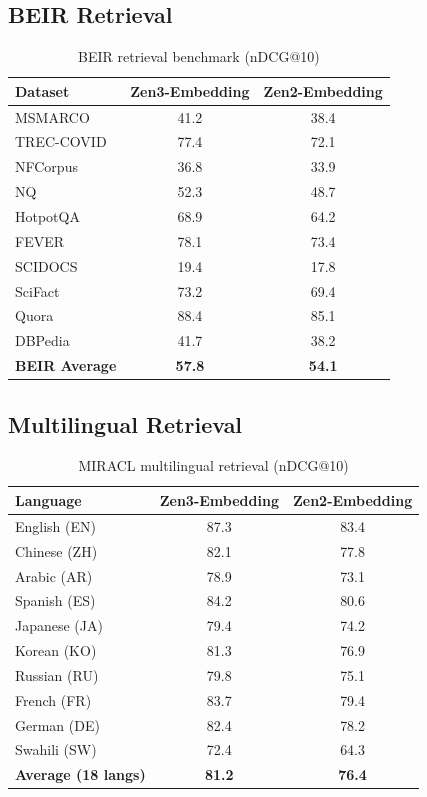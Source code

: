 \documentclass[11pt,a4paper]{article}
\begin{document}
\subsection{BEIR Retrieval}

\begin{table}[H]
\centering
\caption{BEIR retrieval benchmark (nDCG@10)}
\begin{tabular}{lcc}
\toprule
\textbf{Dataset} & \textbf{Zen3-Embedding} & \textbf{Zen2-Embedding} \\
\midrule
MSMARCO         & 41.2 & 38.4 \\
TREC-COVID      & 77.4 & 72.1 \\
NFCorpus        & 36.8 & 33.9 \\
NQ              & 52.3 & 48.7 \\
HotpotQA        & 68.9 & 64.2 \\
FEVER           & 78.1 & 73.4 \\
SCIDOCS         & 19.4 & 17.8 \\
SciFact         & 73.2 & 69.4 \\
Quora           & 88.4 & 85.1 \\
DBPedia         & 41.7 & 38.2 \\
\textbf{BEIR Average} & \textbf{57.8} & \textbf{54.1} \\
\bottomrule
\end{tabular}
\label{tab:beir}
\end{table}

\subsection{Multilingual Retrieval}

\begin{table}[H]
\centering
\caption{MIRACL multilingual retrieval (nDCG@10)}
\begin{tabular}{lcc}
\toprule
\textbf{Language} & \textbf{Zen3-Embedding} & \textbf{Zen2-Embedding} \\
\midrule
English (EN)   & 87.3 & 83.4 \\
Chinese (ZH)   & 82.1 & 77.8 \\
Arabic (AR)    & 78.9 & 73.1 \\
Spanish (ES)   & 84.2 & 80.6 \\
Japanese (JA)  & 79.4 & 74.2 \\
Korean (KO)    & 81.3 & 76.9 \\
Russian (RU)   & 79.8 & 75.1 \\
French (FR)    & 83.7 & 79.4 \\
German (DE)    & 82.4 & 78.2 \\
Swahili (SW)   & 72.4 & 64.3 \\
\textbf{Average (18 langs)} & \textbf{81.2} & \textbf{76.4} \\
\bottomrule
\end{tabular}
\label{tab:miracl}
\end{table}
\end{document}
